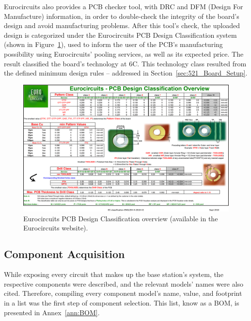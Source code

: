 Eurocircuits also provides a PCB checker tool, with DRC and DFM (Design For Manufacture) information, in order to double-check the integrity of the board's design and avoid manufacturing problems. After this tool's check, the uploaded design is categorized under the Eurocircuits PCB Design Classification system (shown in Figure~\ref{fig:PCB_EC_Class}), used to inform the user of the PCB's manufacturing possibility using Eurocircuits' pooling services, as well as its expected price. The result classified the board's technology at 6C. This technology class resulted from the defined minimum design rules -- addressed in Section~\ref{sec:521_Board_Setup}.

\begin{figure}[h]
	\centering
	\includegraphics[width=1.0\textwidth]{Chapters/Figures/chapter5/prototype/PCB_EC_Class.png}
	\caption{Eurocircuits PCB Design Classification overview (available in the Eurocircuits website).}
	\label{fig:PCB_EC_Class}
\end{figure}

\subsection{Component Acquisition}\label{sec:532_ComponentAcquisition}


While exposing every circuit that makes up the base station's system, the respective components were described, and the relevant models' names were also cited. Therefore, compiling every component model's name, value, and footprint in a list was the first step of component selection. This list, know as a \gls{BOM}, is presented in Annex~\ref{ann:BOM}.

